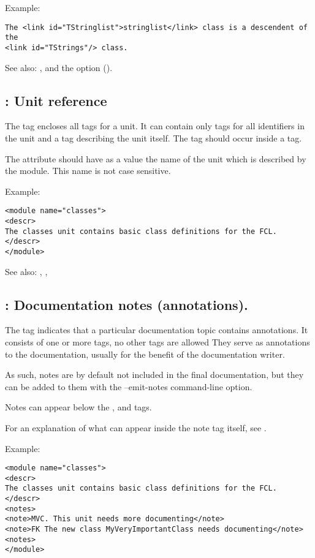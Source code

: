 Example:
\begin{verbatim}
The <link id="TStringlist">stringlist</link> class is a descendent of the
<link id="TStrings"/> class.
\end{verbatim}

See also: ,  and the  option ().

\subsection{ : Unit reference}
\label{tag:module}
The  tag encloses all  tags for a unit. It can
contain only  tags for all identifiers in the unit and 
a  tag describing the unit itself. The  tag should
occur inside a  tag.

The  attribute should have as a value the name of the unit which
is described by the module. This name is not case sensitive.

Example:
\begin{verbatim}
<module name="classes">
<descr>
The classes unit contains basic class definitions for the FCL.
</descr>
</module>
\end{verbatim}

See also: , , 
\subsection{ : Documentation notes (annotations).}
\label{tag:notes}
The  tag indicates that a particular documentation topic contains annotations. 
It consists of one or more  tags, no other tags are allowed
They serve as annotations to the documentation, usually for the benefit of the documentation writer.

As such, notes are by default not included in the final documentation, but they can be added to 
them with the --emit-notes command-line option.

Notes can appear below the ,  and  tags.

For an explanation of what can appear inside the note tag itself, see .

Example:
\begin{verbatim}
<module name="classes">
<descr>
The classes unit contains basic class definitions for the FCL.
</descr>
<notes>
<note>MVC. This unit needs more documenting</note>
<note>FK The new class MyVeryImportantClass needs documenting</note>
<notes>
</module>
\end{verbatim}

